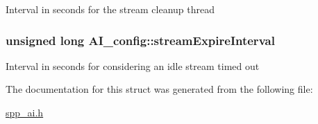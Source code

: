 \label{structAI__config_a9f7680615027d4fb74b4aa144a7028a4}
Interval in seconds for the stream cleanup thread \hypertarget{structAI__config_abbe77d5f94b8c5164bea47acba09c98b}{
\subsubsection[{streamExpireInterval}]{\setlength{\rightskip}{0pt plus 5cm}unsigned long {\bf AI\_\-config::streamExpireInterval}}}
\label{structAI__config_abbe77d5f94b8c5164bea47acba09c98b}
Interval in seconds for considering an idle stream timed out 

The documentation for this struct was generated from the following file:\begin{DoxyCompactItemize}
\item 
\hyperlink{spp__ai_8h}{spp\_\-ai.h}\end{DoxyCompactItemize}
